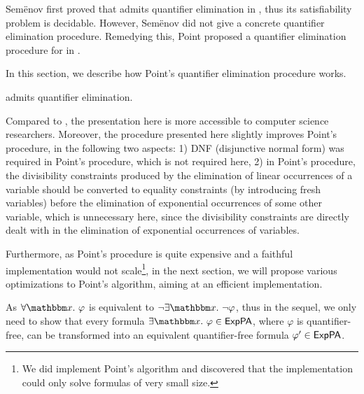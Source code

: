
Sem\"{e}nov first proved that  {\paexp} admits quantifier elimination in \cite{Semenov84}, thus its satisfiability problem is decidable. However, Sem\"{e}nov did not give a concrete quantifier elimination procedure. Remedying this, Point proposed a quantifier elimination procedure for {\paexp} in \cite{Point86}. 

In this section, we describe how Point's quantifier elimination procedure works. 
%
\begin{theorem}
\label{thm-paexp}
{\paexp} admits quantifier elimination.
\end{theorem}
%
Compared to \cite{Point86}, the presentation here is more accessible to computer science researchers. Moreover, the procedure presented here slightly improves Point's procedure, in the following two aspects: 1) DNF (disjunctive normal form) was required in Point's procedure, which is not required here, 2) in Point's procedure, the divisibility constraints produced by the elimination of linear occurrences of a variable should be converted to equality constraints (by introducing fresh variables) before the elimination of exponential occurrences of some other variable, which is unnecessary here, since the divisibility constraints are directly dealt with in the elimination of exponential occurrences of variables.
%
%

Furthermore, as Point's procedure is quite expensive and a faithful implementation would not scale\footnote{We did implement Point's algorithm and discovered that the implementation could only solve formulas of very small size.},
in the next section, we will propose various optimizations to Point's algorithm, aiming at an efficient implementation. 

\smallskip

As $\forall \ivarx. \ \varphi$ is equivalent to $\neg \exists \ivarx. \ \neg \varphi$,  thus in the sequel, we only need to  show that every {\paexp} formula $\exists \ivarx.\ \varphi \in \paexp$, where $\varphi$ is quantifier-free, can be transformed into an equivalent quantifier-free formula $\varphi' \in {\sf ExpPA}$.



